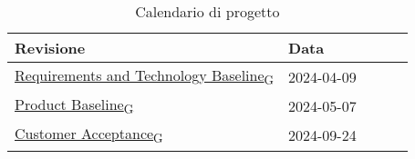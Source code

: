 \begin{table}[!h]
    \begin{center}
        \begin{tabular}{ |l |l |l |l| l| }
            \hline 
            Revisione                               & Data       \\ \hline
            \href{https://7last.github.io/docs/rtb/documentazione-interna/glossario\#requirements-and-technology-baseline}{Requirements and Technology Baseline\textsubscript{G}}    & 2024-04-09 \\
            \href{https://7last.github.io/docs/rtb/documentazione-interna/glossario\#product-baseline}{Product Baseline\textsubscript{G}}                        & 2024-05-07 \\
            \href{https://7last.github.io/docs/rtb/documentazione-interna/glossario\#customer-acceptance}{Customer Acceptance\textsubscript{G}}                     & 2024-09-24 \\
            \hline
        \end{tabular}
    \end{center}
    \caption{Calendario di progetto}
    \label{tab:2}
\end{table}
